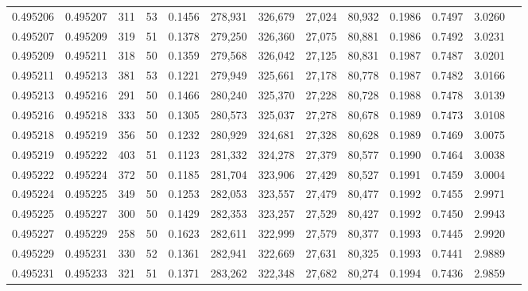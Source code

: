\begin{tabular}{rrrrrrrrrrrrr}
0.495206 & 0.495207 &   311 &  53 &                                     0.1456 & 278,931 & 326,679 &  27,024 &  80,932 & 0.1986 & 0.7497 & 3.0260 \\
0.495207 & 0.495209 &   319 &  51 &                                     0.1378 & 279,250 & 326,360 &  27,075 &  80,881 & 0.1986 & 0.7492 & 3.0231 \\
0.495209 & 0.495211 &   318 &  50 &                                     0.1359 & 279,568 & 326,042 &  27,125 &  80,831 & 0.1987 & 0.7487 & 3.0201 \\
0.495211 & 0.495213 &   381 &  53 &                                     0.1221 & 279,949 & 325,661 &  27,178 &  80,778 & 0.1987 & 0.7482 & 3.0166 \\
0.495213 & 0.495216 &   291 &  50 &                                     0.1466 & 280,240 & 325,370 &  27,228 &  80,728 & 0.1988 & 0.7478 & 3.0139 \\
0.495216 & 0.495218 &   333 &  50 &                                     0.1305 & 280,573 & 325,037 &  27,278 &  80,678 & 0.1989 & 0.7473 & 3.0108 \\
0.495218 & 0.495219 &   356 &  50 &                                     0.1232 & 280,929 & 324,681 &  27,328 &  80,628 & 0.1989 & 0.7469 & 3.0075 \\
0.495219 & 0.495222 &   403 &  51 &                                     0.1123 & 281,332 & 324,278 &  27,379 &  80,577 & 0.1990 & 0.7464 & 3.0038 \\
0.495222 & 0.495224 &   372 &  50 &                                     0.1185 & 281,704 & 323,906 &  27,429 &  80,527 & 0.1991 & 0.7459 & 3.0004 \\
0.495224 & 0.495225 &   349 &  50 &                                     0.1253 & 282,053 & 323,557 &  27,479 &  80,477 & 0.1992 & 0.7455 & 2.9971 \\
0.495225 & 0.495227 &   300 &  50 &                                     0.1429 & 282,353 & 323,257 &  27,529 &  80,427 & 0.1992 & 0.7450 & 2.9943 \\
0.495227 & 0.495229 &   258 &  50 &                                     0.1623 & 282,611 & 322,999 &  27,579 &  80,377 & 0.1993 & 0.7445 & 2.9920 \\
0.495229 & 0.495231 &   330 &  52 &                                     0.1361 & 282,941 & 322,669 &  27,631 &  80,325 & 0.1993 & 0.7441 & 2.9889 \\
0.495231 & 0.495233 &   321 &  51 &                                     0.1371 & 283,262 & 322,348 &  27,682 &  80,274 & 0.1994 & 0.7436 & 2.9859 \\

\end{tabular}
